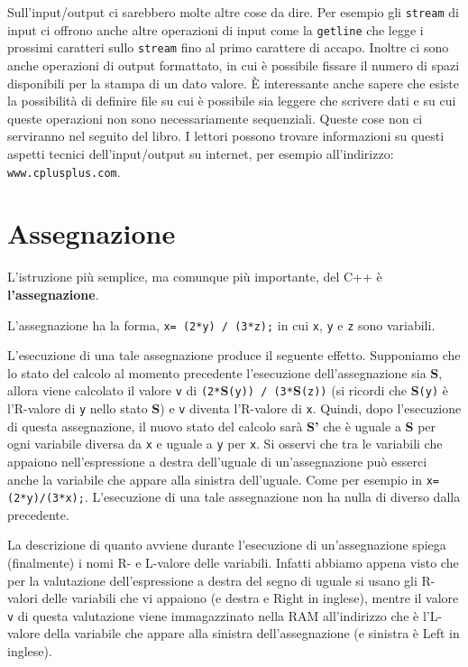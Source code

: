 Sull'input/output ci sarebbero molte altre cose da dire.
Per esempio gli \texttt{stream} di input ci offrono anche altre operazioni di input come la \texttt{getline} che legge i prossimi caratteri sullo \texttt{stream} fino al primo carattere di accapo.
Inoltre ci so­no anche operazioni di output formattato, in cui è possibile fissare il numero di spazi disponibili per la stampa di un dato valore.
È interessante anche sapere che esiste la possibilità di definire file su cui è possibile sia leggere che scrivere dati e su cui queste operazioni non sono necessariamente sequenziali.
Queste cose non ci serviranno nel seguito del libro.
I lettori possono trovare informazioni su questi aspetti tecnici dell'input/output su internet, per esempio all'indirizzo: \texttt{www.cplusplus.com}. 

\section{Assegnazione}
L'istruzione più semplice, ma comunque più importante, del C++ è \textbf{l'assegnazione}.

\noindent L'assegnazione ha la forma, \texttt{x= (2*y) / (3*z);} in cui \texttt{x}, \texttt{y} e \texttt{z} sono variabili.

\noindent L'esecuzione di una tale assegnazione produce il seguente effetto. Supponiamo che lo stato del calcolo al momento precedente l'esecuzione dell'assegnazione sia \textbf{S}, allora viene calcolato il valore \texttt{v} di \texttt{(2*}\textbf{S}\texttt{(y)) / (3*}\textbf{S}\texttt{(z))} (si ricordi che \textbf{S}\texttt{(y)} è l'R-valore di \texttt{y} nello stato \textbf{S}) e \texttt{v} diventa l'R-valore di \texttt{x}.
Quindi, dopo l'esecuzione di questa assegnazione, il nuovo stato del calcolo sarà \textbf{S'} che è uguale a \textbf{S} per ogni variabile diversa da \texttt{x} e uguale a \texttt{y} per \texttt{x}.
Si osservi che tra le variabili che appaiono nell'espressione a destra dell'uguale di un'assegnazione può esserci anche la variabile che appare alla sinistra dell'uguale.
Come per esempio in \texttt{x=(2*y)/(3*x);}.
L'esecuzione di una tale assegnazione non ha nulla di diverso dalla precedente. 

La descrizione di quanto avviene durante l'esecuzione di un'assegnazione spiega (finalmente) i nomi R- e L-valore delle variabili.
Infatti abbiamo appena visto che per la valutazione dell'espressione a destra del segno di uguale si usano gli R-valori delle variabili che vi appaiono (e destra e Right in inglese),
 mentre il valore \texttt{v} di questa valutazione viene immagazzinato nella RAM all'indirizzo che è l'L-valore della variabile che appare alla sinistra dell'assegnazione (e sinistra è Left in inglese). 

